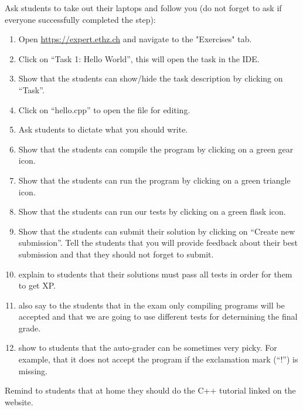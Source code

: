 Ask students to take out their laptops and follow you (do not forget to
ask if everyone successfully completed the step):
\begin{enumerate}
    \item Open \url{https://expert.ethz.ch} and navigate to the "Exercises" 
        tab.
    \item
        Click on “Task 1: Hello World”, this will open the
        task in the IDE.
    \item
        Show that the students can show/hide the task description by
        clicking on “Task”.
    \item
        Click on “hello.cpp” to open the file for editing.
    \item
        Ask students to dictate what you should write.
    \item
        Show that the students can compile the program by clicking on a
        green gear icon.
    \item
        Show that the students can run the program by clicking on a
        green triangle icon.
    \item
        Show that the students can run our tests by clicking on a green
        flask icon.
    \item
        Show that the students can submit their solution by clicking on
        “Create new submission”. Tell the students that you will provide
        feedback about their best submission and that they should not
        forget to submit.
    \item
         explain to students that their solutions
        must pass all tests in order for them to get XP.
    \item
         also say to the students that in the
        exam only compiling programs will be accepted and that we are
        going to use different tests for determining the final grade.
    \item
         show to students that the auto-grader can be
        sometimes very picky. For example, that it does not accept the
        program if the exclamation mark (“!”) is missing.
\end{enumerate}

\quest

Remind to students that at home they should do the C++ tutorial linked
on the website.


\begin{Preparation}
\end{Preparation}


